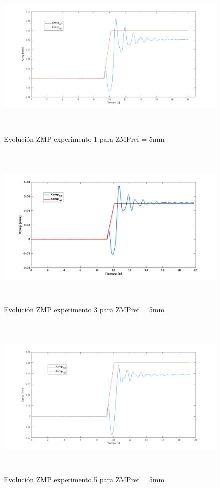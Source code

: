 \begin{figure}[H]
\centering
\includegraphics[width=13cm, height=8cm]{imagenes/apartado_5/5.1/55}
\caption{Evolución ZMP experimento 1 para ZMPref = 5mm}
\label{figura55}
\end{figure}

\begin{figure}[H]
\centering
\includegraphics[width=13cm, height=8cm]{imagenes/apartado_5/5.1/56}
\caption{Evolución ZMP experimento 3 para ZMPref = 5mm }
\label{figura56}
\end{figure}

\begin{figure}[H]
\centering
\includegraphics[width=13cm, height=8cm]{imagenes/apartado_5/5.1/57}
\caption{Evolución ZMP experimento 5 para ZMPref = 5mm}
\label{figura57}
\end{figure}

